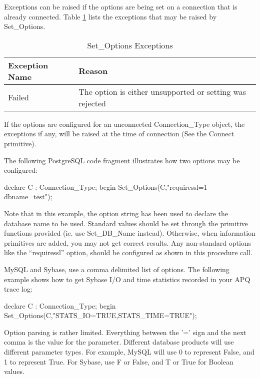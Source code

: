 \documentclass[english,letterpaper]{book}
\begin{document}
Exceptions can be raised if the options are being set on a connection
that is already connected. Table \ref{t:soopts} lists the exceptions that may be
raised by Set\_Options.

\begin{table}
   \begin{center}
      \begin{tabular}{ll}
      Exception Name    &  Reason\\
      \hline 
      Failed            &  The option is either unsupported or setting was rejected\\
      \end{tabular}
   \end{center}
   \caption{Set\_Options Exceptions}\label{t:soopts}
\end{table}

If the options are configured for an unconnected Connection\_Type
object, the exceptions if any, will be raised at the time of connection
(See the Connect primitive).

The following PostgreSQL code fragment illustrates how two options
may be configured:

\begin{Example}
declare
   C : Connection_Type;
begin
   Set_Options(C,"requiressl=1 dbname=test");
\end{Example}

Note that in this example, the option string has been used to declare
the database name to be used. Standard values should be set through
the primitive functions provided (ie. use Set\_DB\_Name instead).
Otherwise, when information primitives are added, you may not get
correct results. Any non-standard options like the ``requiressl''
option, should be configured as shown in this procedure call.

MySQL and Sybase, use a comma delimited list of options.
The following example shows how to get Sybase I/O 
and time statistics recorded in your APQ trace log:

\begin{Example}
declare
  C : Connection_Type;
begin
   Set_Options(C,"STATS_IO=TRUE,STATS_TIME=TRUE");
\end{Example}

Option parsing is rather limited. Everything between the '=' sign
and the next comma is the value for the parameter. Different database
products will use different parameter types. For example, MySQL will
use 0 to represent False, and 1 to represent True. For Sybase, use
F or False, and T or True for Boolean values.
\end{document}
